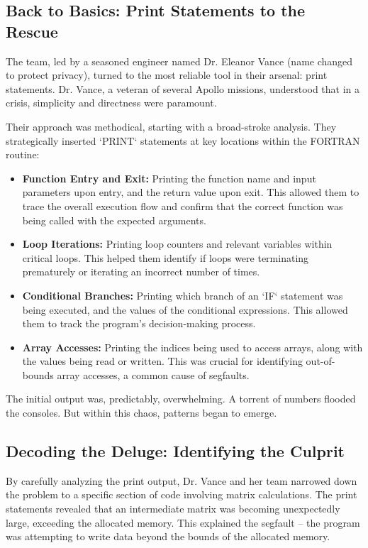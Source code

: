 \documentclass{article}
\begin{document}
{{{{\subsection*{Back to Basics: Print Statements to the Rescue}

The team, led by a seasoned engineer named Dr. Eleanor Vance (name changed to protect privacy), turned to the most reliable tool in their arsenal: print statements. Dr. Vance, a veteran of several Apollo missions, understood that in a crisis, simplicity and directness were paramount.

Their approach was methodical, starting with a broad-stroke analysis. They strategically inserted `PRINT` statements at key locations within the FORTRAN routine:

\begin{itemize}
    \item \textbf{Function Entry and Exit:} Printing the function name and input parameters upon entry, and the return value upon exit. This allowed them to trace the overall execution flow and confirm that the correct function was being called with the expected arguments.

    \item \textbf{Loop Iterations:} Printing loop counters and relevant variables within critical loops. This helped them identify if loops were terminating prematurely or iterating an incorrect number of times.

    \item \textbf{Conditional Branches:} Printing which branch of an `IF` statement was being executed, and the values of the conditional expressions. This allowed them to track the program's decision-making process.

    \item \textbf{Array Accesses:} Printing the indices being used to access arrays, along with the values being read or written. This was crucial for identifying out-of-bounds array accesses, a common cause of segfaults.
\end{itemize}

The initial output was, predictably, overwhelming. A torrent of numbers flooded the consoles. But within this chaos, patterns began to emerge.

\subsection*{Decoding the Deluge: Identifying the Culprit}

By carefully analyzing the print output, Dr. Vance and her team narrowed down the problem to a specific section of code involving matrix calculations. The print statements revealed that an intermediate matrix was becoming unexpectedly large, exceeding the allocated memory. This explained the segfault – the program was attempting to write data beyond the bounds of the allocated memory.

}}}}
\end{document}
